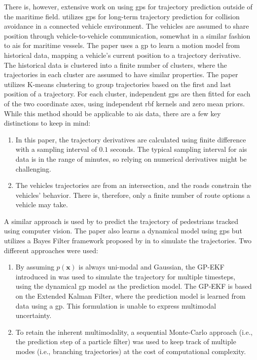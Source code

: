 There is, however, extensive work on using \acrshort{gp}s for trajectory prediction outside of the maritime field. \citeauthor{vehicle_gp_prediction} \cite{vehicle_gp_prediction} utilizes \acrshort{gp}s for long-term trajectory prediction for collision avoidance in a connected vehicle environment. The vehicles are assumed to share position through vehicle-to-vehicle communication, somewhat in a similar fashion to \acrshort{ais} for maritime vessels. The paper uses a \acrshort{gp} to learn a motion model from historical data, mapping a vehicle's current position to a trajectory derivative. The historical data is clustered into a finite number of clusters, where the trajectories in each cluster are assumed to have similar properties. The paper utilizes K-means clustering \cite{murphy} to group trajectories based on the first and last position of a trajectory. For each cluster, independent \acrshort{gp}s are then fitted for each of the two coordinate axes, using independent \acrshort{rbf} kernels and zero mean priors. While this method should be applicable to \acrshort{ais} data, there are a few key distinctions to keep in mind:
\begin{enumerate}
    \item In this paper, the trajectory derivatives are calculated using finite difference with a sampling interval of $0.1$ seconds. The typical sampling interval for \acrshort{ais} data is in the range of minutes, so relying on numerical derivatives might be challenging.
    \item The vehicles trajectories are from an intersection, and the roads constrain the vehicles' behavior. There is, therefore, only a finite number of route options a vehicle may take.
\end{enumerate}

A similar approach is used by \citeauthor{pedestrian} \cite{pedestrian} to predict the trajectory of pedestrians tracked using computer vision. The paper also learns a dynamical model using \acrshort{gp}s but utilizes a Bayes Filter framework proposed by \citeauthor{gpekf} in \cite{gpekf} to simulate the trajectories. Two different approaches were used:
\begin{enumerate}
    \item By assuming $p(\boldsymbol{x})$ is always uni-modal and Gaussian, the GP-EKF introduced in \cite{gpekf} was used to simulate the trajectory for multiple timesteps, using the dynamical \acrshort{gp} model as the prediction model. The GP-EKF is based on the Extended Kalman Filter, where the prediction model is learned from data using a \acrshort{gp}. This formulation is unable to express multimodal uncertainty.
    \item To retain the inherent multimodality, a sequential Monte-Carlo approach (i.e., the prediction step of a particle filter) was used to keep track of multiple modes (i.e., branching trajectories) at the cost of computational complexity.  
\end{enumerate}


